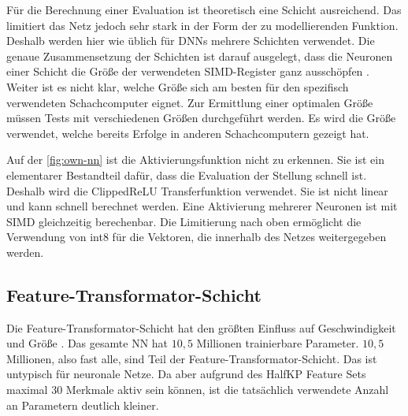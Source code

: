 Für die Berechnung einer Evaluation ist theoretisch eine Schicht ausreichend. Das limitiert das Netz jedoch sehr stark in der Form der zu modellierenden Funktion. Deshalb werden hier wie üblich für \acp{DNN} mehrere Schichten verwendet. Die genaue Zusammensetzung der Schichten ist darauf ausgelegt, dass die Neuronen einer Schicht die Größe der verwendeten \ac{SIMD}-Register ganz ausschöpfen \cite{YNasu2018}. Weiter ist es nicht klar, welche Größe sich am besten für den spezifisch verwendeten Schachcomputer eignet. Zur Ermittlung einer optimalen Größe müssen Tests mit verschiedenen Größen durchgeführt werden. Es wird die Größe verwendet, welche bereits Erfolge in anderen Schachcomputern gezeigt hat.

Auf der \autoref{fig:own-nn} ist die Aktivierungsfunktion nicht zu erkennen. Sie ist ein elementarer Bestandteil dafür, dass die Evaluation der Stellung schnell ist. Deshalb wird die Clipped\ac{ReLU} Transferfunktion verwendet. Sie ist nicht linear und kann schnell berechnet werden. Eine Aktivierung mehrerer Neuronen ist mit \ac{SIMD} gleichzeitig berechenbar. Die Limitierung nach oben ermöglicht die Verwendung von int8 für die Vektoren, die innerhalb des Netzes weitergegeben werden.

\subsection{Feature-Transformator-Schicht}

Die Feature-Transformator-Schicht hat den größten Einfluss auf Geschwindigkeit und Größe \cite{StockfishNNUE}. Das gesamte \ac{NN} hat $10,5$ Millionen trainierbare Parameter. $10,5$ Millionen, also fast alle, sind Teil der Feature-Transformator-Schicht. Das ist untypisch für neuronale Netze. Da aber aufgrund des HalfKP Feature Sets maximal 30 Merkmale aktiv sein können, ist die tatsächlich verwendete Anzahl an Parametern deutlich kleiner.


